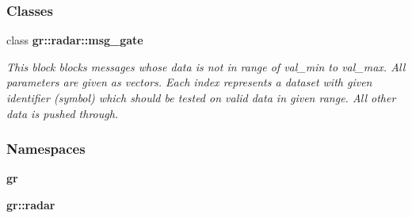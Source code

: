 \subsubsection*{Classes}
\begin{DoxyCompactItemize}
\item 
class {\bf gr\+::radar\+::msg\+\_\+gate}
\begin{DoxyCompactList}\small\item\em This block blocks messages whose data is not in range of val\+\_\+min to val\+\_\+max. All parameters are given as vectors. Each index represents a dataset with given identifier (symbol) which should be tested on valid data in given range. All other data is pushed through. \end{DoxyCompactList}\end{DoxyCompactItemize}
\subsubsection*{Namespaces}
\begin{DoxyCompactItemize}
\item 
 {\bf gr}
\item 
 {\bf gr\+::radar}
\end{DoxyCompactItemize}
